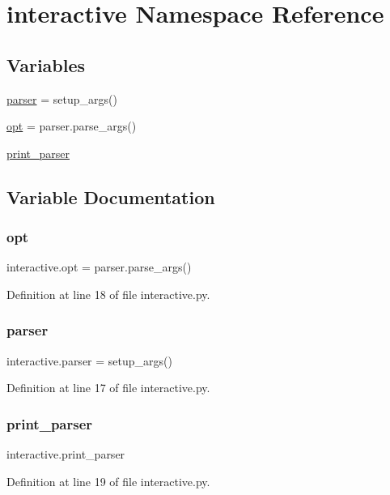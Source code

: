 \hypertarget{namespaceinteractive}{}\section{interactive Namespace Reference}
\label{namespaceinteractive}
\subsection*{Variables}
\begin{DoxyCompactItemize}
\item 
\hyperlink{namespaceinteractive_affc28a281e9fbc688b1515e62dc694db}{parser} = setup\+\_\+args()
\item 
\hyperlink{namespaceinteractive_a4b1cc0a00aa97ce62621d2a9996fe6ff}{opt} = parser.\+parse\+\_\+args()
\item 
\hyperlink{namespaceinteractive_abf63ff4b74ab5876420db088893db0f7}{print\+\_\+parser}
\end{DoxyCompactItemize}


\subsection{Variable Documentation}
\mbox{\label{namespaceinteractive_a4b1cc0a00aa97ce62621d2a9996fe6ff}} 
\subsubsection{\texorpdfstring{opt}{opt}}
{\footnotesize\ttfamily interactive.\+opt = parser.\+parse\+\_\+args()}



Definition at line 18 of file interactive.\+py.

\mbox{\label{namespaceinteractive_affc28a281e9fbc688b1515e62dc694db}} 
\subsubsection{\texorpdfstring{parser}{parser}}
{\footnotesize\ttfamily interactive.\+parser = setup\+\_\+args()}



Definition at line 17 of file interactive.\+py.

\mbox{\label{namespaceinteractive_abf63ff4b74ab5876420db088893db0f7}} 
\subsubsection{\texorpdfstring{print\+\_\+parser}{print\_parser}}
{\footnotesize\ttfamily interactive.\+print\+\_\+parser}



Definition at line 19 of file interactive.\+py.


